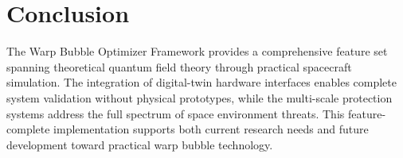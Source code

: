 \documentclass[11pt]{article}
\begin{document}
\section{Conclusion}

The Warp Bubble Optimizer Framework provides a comprehensive feature set spanning theoretical quantum field theory through practical spacecraft simulation. The integration of digital-twin hardware interfaces enables complete system validation without physical prototypes, while the multi-scale protection systems address the full spectrum of space environment threats. This feature-complete implementation supports both current research needs and future development toward practical warp bubble technology.
\end{document}
